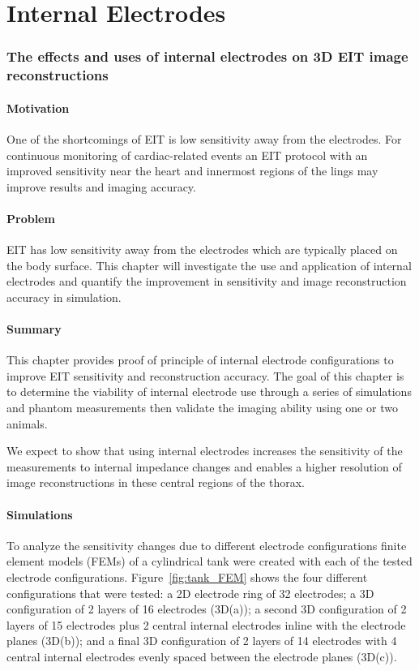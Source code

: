 \chapter{Internal Electrodes}
\subsection{The effects and uses of internal electrodes on 3D EIT image reconstructions}

\subsubsection{Motivation}
One of the shortcomings of EIT is low sensitivity away from the electrodes. 
For continuous monitoring of cardiac-related events an EIT protocol with an improved sensitivity 
near the heart and innermost regions of the lings may improve results and imaging accuracy.

\subsubsection{Problem}
EIT has low sensitivity away from the electrodes which are typically placed on the body surface. 
This chapter will investigate the use and application of internal electrodes and quantify the improvement 
in sensitivity and image reconstruction accuracy in simulation.

\subsubsection{Summary}
This chapter provides proof of principle of internal electrode configurations to 
improve EIT sensitivity and reconstruction accuracy.
The goal of this chapter is to determine the viability of internal electrode use through a series of simulations and phantom measurements then validate
the imaging ability using one or two animals. 

We expect to show that using internal electrodes increases the sensitivity of the measurements to internal impedance changes 
and enables a higher resolution of image reconstructions in these central regions of the thorax. 

\subsubsection{Simulations}
To analyze the sensitivity changes due to different electrode 
configurations finite element models (FEMs) of a cylindrical tank were 
created with each of the tested electrode configurations. Figure~\ref{fig:tank_FEM} shows the four 
different configurations that were tested: a 2D 
electrode ring of 32 electrodes; a 3D configuration of 2 layers of 16 
electrodes (3D(a)); a second 3D configuration of 2 layers of 15 electrodes 
plus 2 central internal electrodes inline with the electrode planes (3D(b)); and a final 3D configuration of 
2 layers of 14 electrodes with 4 central internal electrodes evenly spaced between the electrode planes (3D(c)).

